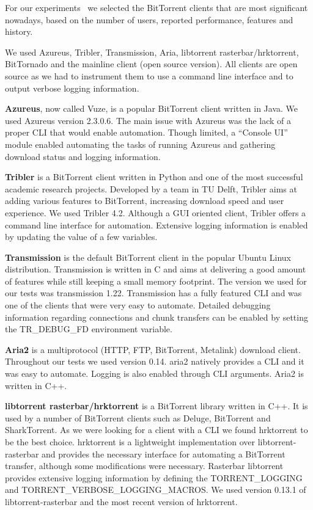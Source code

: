 For our experiments~\cite{bt-pef} we selected the BitTorrent clients that are most
significant nowadays, based on the number of users, reported performance,
features and history.

We used Azureus, Tribler, Transmission, Aria, libtorrent rasterbar/hrktorrent,
BitTornado and the mainline client (open source version). All clients are open
source as we had to instrument them to use a command line interface and to
output verbose logging information.

\textbf{Azureus}, now called Vuze, is a popular BitTorrent client written in
Java. We used Azureus version 2.3.0.6. The main issue with Azureus was the
lack of a proper CLI that would enable automation. Though limited, a ``Console
UI'' module enabled automating the tasks of running Azureus and gathering
download status and logging information.

\textbf{Tribler} is a BitTorrent client written in Python and one of the most
successful academic research projects. Developed by a team in TU Delft,
Tribler aims at adding various features to BitTorrent, increasing download
speed and user experience. We used Tribler 4.2. Although a GUI oriented
client, Tribler offers a command line interface for automation. Extensive
logging information is enabled by updating the value of a few variables.

\textbf{Transmission} is the default BitTorrent client in the popular Ubuntu
Linux distribution. Transmission is written in C and aims at delivering a good
amount of features while still keeping a small memory footprint. The version
we used for our tests was transmission 1.22. Transmission has a fully
featured CLI and was one of the clients that were very easy to automate.
Detailed debugging information regarding connections and chunk transfers can
be enabled by setting the TR\_DEBUG\_FD environment variable.

\textbf{Aria2} is a multiprotocol (HTTP, FTP, BitTorrent, Metalink) download
client. Throughout our tests we used version 0.14. aria2 natively provides a
CLI and it was easy to automate. Logging is also enabled through CLI
arguments. Aria2 is written in C++.

\textbf{libtorrent rasterbar/hrktorrent} is a BitTorrent library written in
C++. It is used by a number of BitTorrent clients such as Deluge, BitTorrent
and SharkTorrent. As we were looking for a client with a CLI we found
hrktorrent to be the best choice. hrktorrent is a lightweight implementation
over libtorrent-rasterbar and provides the necessary interface for automating
a BitTorrent transfer, although some modifications were necessary. Rasterbar
libtorrent provides extensive logging information by defining the
TORRENT\_LOGGING and TORRENT\_VERBOSE\_LOGGING\_MACROS. We used version 0.13.1
of libtorrent-rasterbar and the most recent version of hrktorrent.

